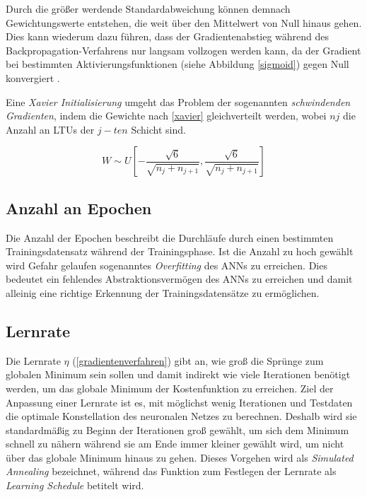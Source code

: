 Durch die größer werdende Standardabweichung können demnach Gewichtungswerte entstehen, die weit über den Mittelwert von Null hinaus gehen. Dies kann wiederum dazu führen, dass der Gradientenabstieg während des Backpropagation-Verfahrens nur langsam vollzogen werden kann, da der Gradient bei bestimmten Aktivierungsfunktionen (siehe Abbildung \ref{sigmoid}) gegen Null konvergiert \cite{AurelienGeron.2018}. 

Eine \textit{Xavier Initialisierung} umgeht das Problem der sogenannten \textit{schwindenden Gradienten}, indem die Gewichte nach \ref{xavier} gleichverteilt werden, wobei $n{j}$ die Anzahl an LTUs der $j-ten$ Schicht sind. \cite{XavierGlorot.2010}

\begin{equation} \label{xavier}
W \sim U[-\frac{\sqrt{6}}{\sqrt{n_{j} + n_{j+1}}},\frac{\sqrt{6}}{\sqrt{n_{j} + n_{j+1}}}]
\end{equation}

\subsection*{Anzahl an Epochen}

Die Anzahl der Epochen beschreibt die Durchläufe durch einen bestimmten Trainingsdatensatz während der Trainingsphase. Ist die Anzahl zu hoch gewählt wird Gefahr gelaufen sogenanntes \textit{Overfitting} des ANNs zu erreichen. Dies bedeutet ein fehlendes Abstraktionsvermögen des ANNs zu erreichen und damit alleinig eine richtige Erkennung der Trainingsdatensätze zu ermöglichen.  

\subsection*{Lernrate}

Die Lernrate $\eta$ (\ref{gradientenverfahren}) gibt an, wie groß die Sprünge zum globalen Minimum sein sollen und damit indirekt wie viele Iterationen benötigt werden, um das globale Minimum der Kostenfunktion zu erreichen. Ziel der Anpassung einer Lernrate ist es, mit möglichst wenig Iterationen und Testdaten die optimale Konstellation des neuronalen Netzes zu berechnen. Deshalb wird sie standardmäßig zu Beginn der Iterationen groß gewählt, um sich dem Minimum schnell zu nähern während sie am Ende immer kleiner gewählt wird, um nicht über das globale Minimum hinaus zu gehen. Dieses Vorgehen wird als \textit{Simulated Annealing} bezeichnet, während das Funktion zum Festlegen der Lernrate als \textit{Learning Schedule} betitelt wird. \cite{AurelienGeron.2018}

